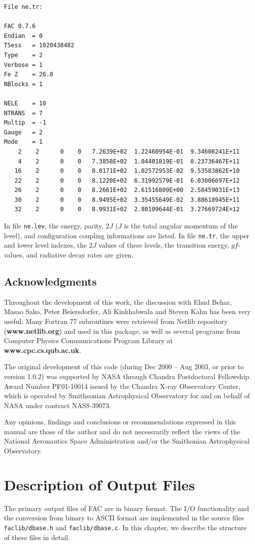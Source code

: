 \documentclass[twoside,letterpaper]{refrep}
\begin{document}
\begin{verbatim}
File ne.tr:

FAC 0.7.6
Endian	= 0
TSess	= 1020438482
Type	= 2
Verbose	= 1
Fe Z	= 26.0
NBlocks	= 1

NELE	= 10
NTRANS	= 7
Multip	= -1
Gauge	= 2
Mode	= 1
    2	 2	    0	 0	 7.2639E+02  1.22460954E-01  9.34608241E+11
    4	 2	    0	 0	 7.3858E+02  1.04401819E-01  8.23736467E+11
   16	 2	    0	 0	 8.0171E+02  1.02572953E-02  9.53583862E+10
   22	 2	    0	 0	 8.1220E+02  6.31992579E-01  6.03006697E+12
   26	 2	    0	 0	 8.2661E+02  2.61516809E+00  2.58459031E+13
   30	 2	    0	 0	 8.9495E+02  3.35455649E-02  3.88618945E+11
   32	 2	    0	 0	 8.9931E+02  2.80109644E-01  3.27669724E+12
\end{verbatim}

In file \verb|ne.lev|, the energy, parity, $2J$ ($J$ is the total
angular momentum of the level), and configuration coupling informations are
listed. In file \verb|ne.tr|, the upper and lower level indexes, the $2J$
values of these levels, the transition energy, $gf$-values, and radiative
decay rates are given.

\section*{Acknowledgments}
Throughout the development of this work, the discussion with Ehud Behar, Masao
Sako, Peter Beiersdorfer, Ali Kinkhabwala and Steven Kahn has been very
useful. Many Fortran 77 subroutines were retrieved from Netlib repository
(\textbf{www.netlib.org}) and used in this package, as well as several
programs from Computer Physics Communications Program Library at
\textbf{www.cpc.cs.qub.ac.uk}.

The original development of this code (during Dec 2000 -- Aug 2003, or prior
to version 1.0.2) was
supported by NASA through Chandra Postdoctoral Fellowship Award Number
PF01-10014 issued by the Chandra X-ray Observatory Center, which is operated
by Smithsonian Astrophysical Observatory for and on behalf of NASA under
contract NAS8-39073. 

Any opinions, findings and conclusions or
recommendations expressed in this manual are those of the author and do not
necessrarily reflect the views of the National Aeronautics Space
Administration and/or the Smithonian Astrophysical Observatory.

\chapter{Description of Output Files}
\label{cha:format}
The primary output files of FAC are in binary format. The I/O functionality
and the conversion from binary to ASCII format are implemented in the source
files \verb|faclib/dbase.h| and \verb|faclib/dbase.c|. In this chapter, we
describe the structure of these files in detail.
\end{document}
